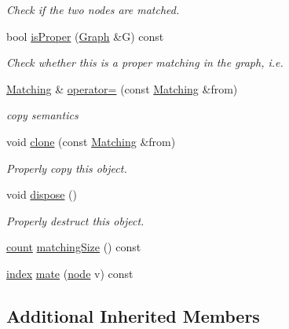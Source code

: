 \begin{DoxyCompactItemize}
\begin{DoxyCompactList}\small\item\em Check if the two nodes are matched. \end{DoxyCompactList}\item 
bool \hyperlink{class_networ_kit_1_1_matching_a0fde7bb5ee1f95858afe7782e9ea7158}{is\-Proper} (\hyperlink{class_networ_kit_1_1_graph}{Graph} \&G) const 
\begin{DoxyCompactList}\small\item\em Check whether this is a proper matching in the graph, i.\-e. \end{DoxyCompactList}\item 
\hyperlink{class_networ_kit_1_1_matching}{Matching} \& \hyperlink{class_networ_kit_1_1_matching_aa1807bdcb5f5aea56a9e08afbdd7023c}{operator=} (const \hyperlink{class_networ_kit_1_1_matching}{Matching} \&from)
\begin{DoxyCompactList}\small\item\em copy semantics \end{DoxyCompactList}\item 
void \hyperlink{class_networ_kit_1_1_matching_ad93d7eacc7dfee2b6732bb6296cb9e6b}{clone} (const \hyperlink{class_networ_kit_1_1_matching}{Matching} \&from)
\begin{DoxyCompactList}\small\item\em Properly copy this object. \end{DoxyCompactList}\item 
void \hyperlink{class_networ_kit_1_1_matching_a6fc203e8f1f6485d05b70a0e502bc210}{dispose} ()
\begin{DoxyCompactList}\small\item\em Properly destruct this object. \end{DoxyCompactList}\item 
\hyperlink{namespace_networ_kit_ad4c536a5339a8bf2f91f418b9a67a7d8}{count} \hyperlink{class_networ_kit_1_1_matching_abd61defac0cb2868d7c80739b0f6e902}{matching\-Size} () const 
\item 
\hyperlink{namespace_networ_kit_af49e67df68af41dcd75dffbb1e9abee6}{index} \hyperlink{class_networ_kit_1_1_matching_a76cf82e05446a8f29b1c46d1dcdef2f3}{mate} (\hyperlink{namespace_networ_kit_a61914158fd771265be48de9942369160}{node} v) const 
\end{DoxyCompactItemize}
\subsection*{Additional Inherited Members}


